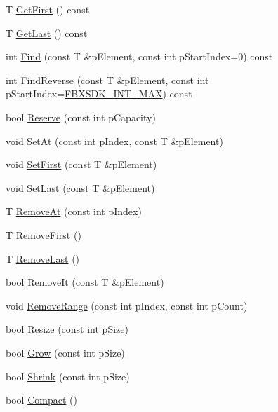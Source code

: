 \begin{DoxyCompactItemize}
\item 
T \hyperlink{class_fbx_array_a913fc7ea982235d344c572f47367b96c}{Get\+First} () const
\item 
T \hyperlink{class_fbx_array_a25a185391ce395e3d409ceef08200f14}{Get\+Last} () const
\item 
int \hyperlink{class_fbx_array_a3f49660f02887b59d7e66ed09aa0d1cb}{Find} (const T \&p\+Element, const int p\+Start\+Index=0) const
\item 
int \hyperlink{class_fbx_array_ae2dc6ac4c90e3a0724787cec5ebdeb05}{Find\+Reverse} (const T \&p\+Element, const int p\+Start\+Index=\hyperlink{fbxtypes_8h_afb502e98178f45295bfde50dd04483d3}{F\+B\+X\+S\+D\+K\+\_\+\+I\+N\+T\+\_\+\+M\+AX}) const
\item 
bool \hyperlink{class_fbx_array_a7d5a64be591ee59708079c2c5fe0dd1b}{Reserve} (const int p\+Capacity)
\item 
void \hyperlink{class_fbx_array_a5229637f8e7dbee48fb8af9d03ecde14}{Set\+At} (const int p\+Index, const T \&p\+Element)
\item 
void \hyperlink{class_fbx_array_a774337e192792ec62ec89739399860f2}{Set\+First} (const T \&p\+Element)
\item 
void \hyperlink{class_fbx_array_ae7fe05cc12ae00d74dd8db0ea8b6ca31}{Set\+Last} (const T \&p\+Element)
\item 
T \hyperlink{class_fbx_array_a6a4be3173c8ec89179b7cf21687d7d61}{Remove\+At} (const int p\+Index)
\item 
T \hyperlink{class_fbx_array_ade8f6c6fbc62584870d16ffd1e011559}{Remove\+First} ()
\item 
T \hyperlink{class_fbx_array_ac346e868cc4a37ea1c292bdd9c3eca2e}{Remove\+Last} ()
\item 
bool \hyperlink{class_fbx_array_aed7ae152655404e95e5107824721e93c}{Remove\+It} (const T \&p\+Element)
\item 
void \hyperlink{class_fbx_array_a63331ed053272acd6262f374f535f170}{Remove\+Range} (const int p\+Index, const int p\+Count)
\item 
bool \hyperlink{class_fbx_array_adc40ba9746e3d8586a525a3347c7cc4d}{Resize} (const int p\+Size)
\item 
bool \hyperlink{class_fbx_array_a5d4cc67b153105946b82b178b7240a5a}{Grow} (const int p\+Size)
\item 
bool \hyperlink{class_fbx_array_a252df10a0b24e15b515be15dcbfb6e0a}{Shrink} (const int p\+Size)
\item 
bool \hyperlink{class_fbx_array_af841a63f9f07b47630ccae34aee7b97a}{Compact} ()

\end{DoxyCompactItemize}
